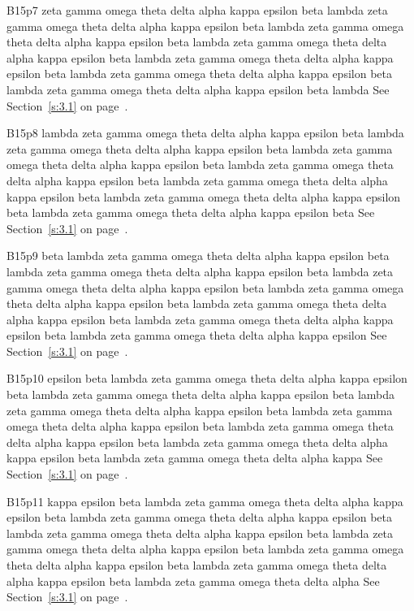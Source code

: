 B15p7 zeta gamma omega theta delta alpha kappa epsilon beta lambda zeta gamma omega theta delta alpha kappa epsilon beta lambda zeta gamma omega theta delta alpha kappa epsilon beta lambda zeta gamma omega theta delta alpha kappa epsilon beta lambda zeta gamma omega theta delta alpha kappa epsilon beta lambda zeta gamma omega theta delta alpha kappa epsilon beta lambda zeta gamma omega theta delta alpha kappa epsilon beta lambda See Section~\ref{s:3.1} on page~\pageref{s:3.1}.

B15p8 lambda zeta gamma omega theta delta alpha kappa epsilon beta lambda zeta gamma omega theta delta alpha kappa epsilon beta lambda zeta gamma omega theta delta alpha kappa epsilon beta lambda zeta gamma omega theta delta alpha kappa epsilon beta lambda zeta gamma omega theta delta alpha kappa epsilon beta lambda zeta gamma omega theta delta alpha kappa epsilon beta lambda zeta gamma omega theta delta alpha kappa epsilon beta See Section~\ref{s:3.1} on page~\pageref{s:3.1}.

B15p9 beta lambda zeta gamma omega theta delta alpha kappa epsilon beta lambda zeta gamma omega theta delta alpha kappa epsilon beta lambda zeta gamma omega theta delta alpha kappa epsilon beta lambda zeta gamma omega theta delta alpha kappa epsilon beta lambda zeta gamma omega theta delta alpha kappa epsilon beta lambda zeta gamma omega theta delta alpha kappa epsilon beta lambda zeta gamma omega theta delta alpha kappa epsilon See Section~\ref{s:3.1} on page~\pageref{s:3.1}.

B15p10 epsilon beta lambda zeta gamma omega theta delta alpha kappa epsilon beta lambda zeta gamma omega theta delta alpha kappa epsilon beta lambda zeta gamma omega theta delta alpha kappa epsilon beta lambda zeta gamma omega theta delta alpha kappa epsilon beta lambda zeta gamma omega theta delta alpha kappa epsilon beta lambda zeta gamma omega theta delta alpha kappa epsilon beta lambda zeta gamma omega theta delta alpha kappa See Section~\ref{s:3.1} on page~\pageref{s:3.1}.

B15p11 kappa epsilon beta lambda zeta gamma omega theta delta alpha kappa epsilon beta lambda zeta gamma omega theta delta alpha kappa epsilon beta lambda zeta gamma omega theta delta alpha kappa epsilon beta lambda zeta gamma omega theta delta alpha kappa epsilon beta lambda zeta gamma omega theta delta alpha kappa epsilon beta lambda zeta gamma omega theta delta alpha kappa epsilon beta lambda zeta gamma omega theta delta alpha See Section~\ref{s:3.1} on page~\pageref{s:3.1}.

